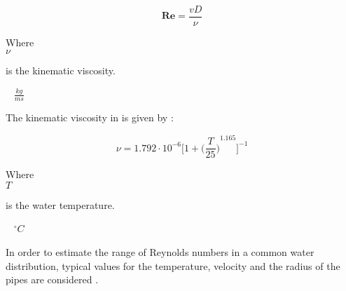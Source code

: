\begin{equation}
   \bm{Re} = \frac{vD}{\nu}
   \label{Reynolds}
 \end{equation}
 
  \begin{minipage}[t]{0.20\textwidth}
Where\\
\hspace*{8mm} $\nu$ 
\end{minipage}
\begin{minipage}[t]{0.68\textwidth}
\vspace*{2mm}
is the kinematic viscosity.

\end{minipage}
\begin{minipage}[t]{0.10\textwidth}
\vspace*{2mm}
\textcolor{White}{te}$\unit{\frac{kg}{ms}}$
\end{minipage}

The kinematic viscosity in \cite{Design_Water} is given by :

\begin{equation}
  \nu = 1.792 \cdot 10^{-6} \bigg[1+{\bigg(\frac{T}{25}\bigg)}^{1.165} \bigg]^{-1}
\end{equation}

  \begin{minipage}[t]{0.20\textwidth}
Where\\
\hspace*{8mm} $T$ 
\end{minipage}
\begin{minipage}[t]{0.68\textwidth}
\vspace*{2mm}
is the water temperature.
 \end{minipage}
\begin{minipage}[t]{0.10\textwidth}
\vspace*{2mm}
\textcolor{White}{te}$\unit{^{\circ} C}$
\end{minipage}

In order to estimate the range of Reynolds numbers in a common water 
distribution, typical values for the temperature, velocity and the radius of 
the pipes are considered \cite{Urban_Design}. 


